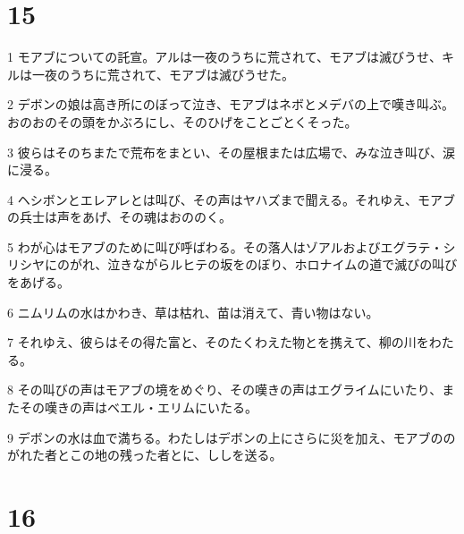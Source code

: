 \chapter{15}

\par 1 モアブについての託宣。アルは一夜のうちに荒されて、モアブは滅びうせ、キルは一夜のうちに荒されて、モアブは滅びうせた。
\par 2 デボンの娘は高き所にのぼって泣き、モアブはネボとメデバの上で嘆き叫ぶ。おのおのその頭をかぶろにし、そのひげをことごとくそった。
\par 3 彼らはそのちまたで荒布をまとい、その屋根または広場で、みな泣き叫び、涙に浸る。
\par 4 ヘシボンとエレアレとは叫び、その声はヤハズまで聞える。それゆえ、モアブの兵士は声をあげ、その魂はおののく。
\par 5 わが心はモアブのために叫び呼ばわる。その落人はゾアルおよびエグラテ・シリシヤにのがれ、泣きながらルヒテの坂をのぼり、ホロナイムの道で滅びの叫びをあげる。
\par 6 ニムリムの水はかわき、草は枯れ、苗は消えて、青い物はない。
\par 7 それゆえ、彼らはその得た富と、そのたくわえた物とを携えて、柳の川をわたる。
\par 8 その叫びの声はモアブの境をめぐり、その嘆きの声はエグライムにいたり、またその嘆きの声はベエル・エリムにいたる。
\par 9 デボンの水は血で満ちる。わたしはデボンの上にさらに災を加え、モアブののがれた者とこの地の残った者とに、ししを送る。

\chapter{16}

